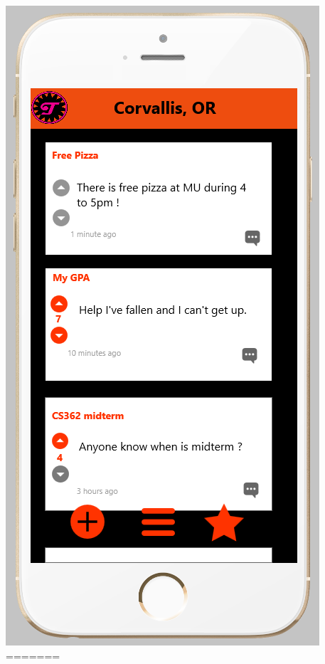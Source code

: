 \documentclass[12pt]{article}
\begin{document}
\begin{center}
\includegraphics[scale=0.30]{img/ui/post-review}\linebreak
=======

\end{center}
\end{document}
